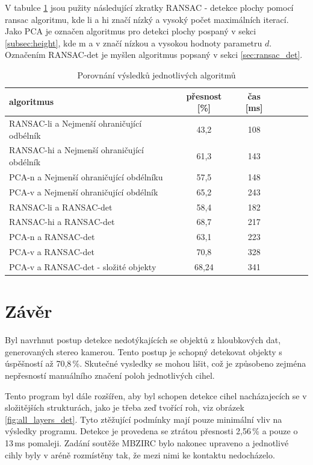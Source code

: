\documentclass[twoside]{ctuthesis}
\begin{document}
V tabulce \ref{tab:vysledky} jsou pužity následující zkratky RANSAC - detekce plochy pomocí ransac algoritmu, kde li a hi značí nízký a vysoký počet maximálních iterací. Jako PCA je označen algoritmus pro detekci plochy pospaný v sekci \ref{subsec:height}, kde m a v značí nízkou a vysokou hodnoty parametru $d$. Označením RANSAC-det je myšlen algoritmus popsaný v sekci \ref{sec:ransac_det}.
\begin{table}
    \centering
    \begin{tabular}{|l|c|c|c|c|c|c|} \hline
        algoritmus &  přesnost [\%]& čas [ms]\\ \hline
        RANSAC-li a Nejmenší ohraničující odbélník & 43,2 & 108 \\ \hline
        RANSAC-hi a Nejmenší ohraničující obdélník & 61,3 & 143 \\ \hline
        PCA-n a Nejmenší ohraničující obdélníku & 57,5 & 148 \\ \hline 
        PCA-v a Nejmenší ohraničující obdélník & 65,2 & 243 \\ \hline
        RANSAC-li a RANSAC-det & 58,4 & 182 \\ \hline
        RANSAC-hi a RANSAC-det & 68,7 & 217 \\ \hline
        PCA-n a RANSAC-det & 63,1 & 223 \\ \hline 
        PCA-v a RANSAC-det & 70,8 & 328 \\ \hline
        PCA-v a RANSAC-det - složité objekty & 68,24 & 341 \\ \hline
    \end{tabular}
    \caption{Porovnání výsledků jednotlivých algoritmů}
    \label{tab:vysledky}
\end{table}
\chapter{Závěr}
\label{sec:závěr}
Byl navrhnut postup detekce nedotýkajících se objektů z hloubkových dat, generovaných stereo kamerou. Tento postup je schopný detekovat objekty s úspěšností až 70,8\,\%. Skutečné vysledky se mohou lišit, což je způsobeno zejména nepřesností manuálního značení poloh jednotlivých cihel.

Tento program byl dále rozšířen, aby byl schopen detekce cihel nacházajecích se v složitějších strukturách, jako je třeba zeď tvořící roh, viz obrázek \ref{fig:all_layers_det}. Tyto ztěžující podmínky mají pouze minimální vliv na výsledky programu. Detekce je provedena se ztrátou přesnosti 2,56\,\% a pouze o 13\,ms pomaleji. Zadání soutěže MBZIRC bylo nakonec upraveno a jednotlivé cihly byly v aréně rozmístěny tak, že mezi nimi ke kontaktu nedocházelo.
\end{document}
